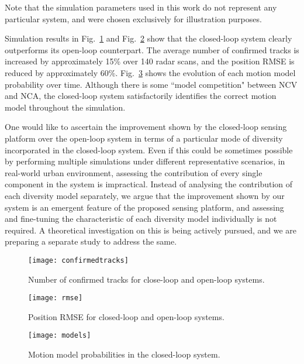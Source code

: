\documentclass[times]{asjcauth}
\begin{document}
Note that the simulation parameters used in this work do not represent any particular system, and were chosen exclusively for illustration purposes.

Simulation results in Fig.~\ref{figconfirmed} and Fig.~\ref{figrmse} show that the closed-loop system clearly outperforms its open-loop counterpart. The average number of confirmed tracks is increased by approximately 15\% over 140 radar scans, and the position RMSE is reduced by approximately 60\%. Fig.~\ref{figmodels} shows the evolution of each motion model probability over time. Although there is some ``model competition" between NCV and NCA, the closed-loop system satisfactorily identifies the correct motion model throughout the simulation.

One would like to ascertain the improvement shown by the closed-loop sensing platform over the open-loop system in terms of a particular mode of diversity incorporated in the closed-loop system. Even if this could be sometimes possible by performing multiple simulations under different representative scenarios, in real-world urban environment, assessing the contribution of every single component in the system is impractical. Instead of analysing the contribution of each diversity model separately, we argue that the improvement shown by our system is an emergent feature of the proposed sensing platform, and assessing and fine-tuning the characteristic of each diversity model individually is not required. A theoretical investigation on this is being actively pursued, and we are preparing a separate study to address the same.

\begin{figure}[hbtp]
\centering
\texttt{[image: confirmedtracks]}
\caption{Number of confirmed tracks for close-loop and open-loop systems.}\label{figconfirmed}
\end{figure}

\begin{figure}[hbtp]
\centering
\texttt{[image: rmse]}
\caption{Position RMSE for closed-loop and open-loop systems.}\label{figrmse}
\end{figure}

\begin{figure}[hbtp]
\centering
\texttt{[image: models]}
\caption{Motion model probabilities in the closed-loop system.}\label{figmodels}
\end{figure}

\end{document}
